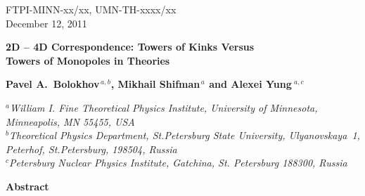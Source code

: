 \documentclass[epsfig,12pt]{article}
\begin{document}



\begin{titlepage}

\begin{flushright}
FTPI-MINN-xx/xx, UMN-TH-xxxx/xx\\
December 12, 2011
\end{flushright}

\vspace{1.1cm}

\begin{center}
{  \Large \bf  
			2D -- 4D Correspondence: Towers of Kinks Versus\\[1mm]  Towers of Monopoles
			in  Theories
			
}
\end{center}
\vspace{0.6cm}

\begin{center}

 {\large
 \bf   Pavel A.~Bolokhov$^{\,a,b}$,  Mikhail Shifman$^{\,a}$ and \bf Alexei Yung$^{\,\,a,c}$}
\end {center}

\begin{center}

$^a${\it  William I. Fine Theoretical Physics Institute, University of Minnesota,
Minneapolis, MN 55455, USA}\\
$^b${\it Theoretical Physics Department, St.Petersburg State University, Ulyanovskaya~1, 
	 Peterhof, St.Petersburg, 198504, Russia}\\
$^{c}${\it Petersburg Nuclear Physics Institute, Gatchina, St. Petersburg
188300, Russia
}
\end{center}


\vspace{0.7cm}


\begin{center}
{\large\bf Abstract}
\end{center}

\hspace{0.3cm}
\vspace{2cm}

\end{titlepage}

\newpage
\end{document}
